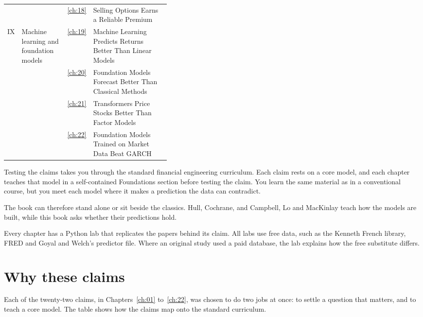 \begin{table}[htbp]
\begin{tabularx}{0.95\linewidth}{@{}>{\raggedright\arraybackslash}p{0.07\linewidth}>{\raggedright\arraybackslash}p{0.28\linewidth}>{\raggedleft\arraybackslash}p{0.04\linewidth}>{\raggedright\arraybackslash}X@{}}
 &  & \ref{ch:18} & Selling Options Earns a Reliable Premium \\
\addlinespace
IX & Machine learning and foundation models & \ref{ch:19} & Machine Learning Predicts Returns Better Than Linear Models \\
 &  & \ref{ch:20} & Foundation Models Forecast Better Than Classical Methods \\
 &  & \ref{ch:21} & Transformers Price Stocks Better Than Factor Models \\
 &  & \ref{ch:22} & Foundation Models Trained on Market Data Beat GARCH \\
\bottomrule
\end{tabularx}
\end{table}


Testing the claims takes you through the standard financial engineering curriculum. Each claim rests on a core model, and each chapter teaches that model in a self-contained Foundations section before testing the claim. You learn the same material as in a conventional course, but you meet each model where it makes a prediction the data can contradict.

The book can therefore stand alone or sit beside the classics. Hull, Cochrane, and Campbell, Lo and MacKinlay teach how the models are built, while this book asks whether their predictions hold.

Every chapter has a Python lab that replicates the papers behind its claim. All labs use free data, such as the Kenneth French library, FRED and Goyal and Welch's predictor file. Where an original study used a paid database, the lab explains how the free substitute differs.


\section*{Why these claims}

Each of the twenty-two claims, in Chapters~\ref{ch:01} to~\ref{ch:22}, was chosen to do two jobs at once: to settle a question that matters, and to teach a core model. The table shows how the claims map onto the standard curriculum. 


